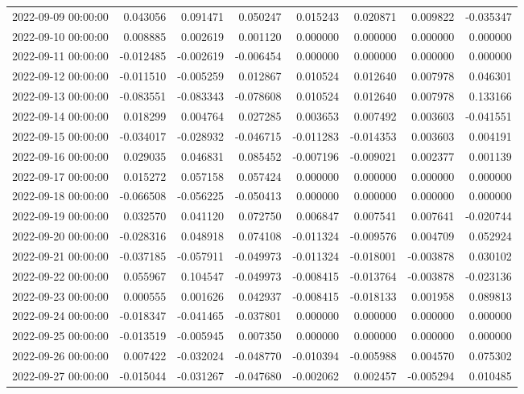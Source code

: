\begin{tabular}{lrrrrrrr}
2022-09-09 00:00:00 & 0.043056 & 0.091471 & 0.050247 & 0.015243 & 0.020871 & 0.009822 & -0.035347 \\
2022-09-10 00:00:00 & 0.008885 & 0.002619 & 0.001120 & 0.000000 & 0.000000 & 0.000000 & 0.000000 \\
2022-09-11 00:00:00 & -0.012485 & -0.002619 & -0.006454 & 0.000000 & 0.000000 & 0.000000 & 0.000000 \\
2022-09-12 00:00:00 & -0.011510 & -0.005259 & 0.012867 & 0.010524 & 0.012640 & 0.007978 & 0.046301 \\
2022-09-13 00:00:00 & -0.083551 & -0.083343 & -0.078608 & 0.010524 & 0.012640 & 0.007978 & 0.133166 \\
2022-09-14 00:00:00 & 0.018299 & 0.004764 & 0.027285 & 0.003653 & 0.007492 & 0.003603 & -0.041551 \\
2022-09-15 00:00:00 & -0.034017 & -0.028932 & -0.046715 & -0.011283 & -0.014353 & 0.003603 & 0.004191 \\
2022-09-16 00:00:00 & 0.029035 & 0.046831 & 0.085452 & -0.007196 & -0.009021 & 0.002377 & 0.001139 \\
2022-09-17 00:00:00 & 0.015272 & 0.057158 & 0.057424 & 0.000000 & 0.000000 & 0.000000 & 0.000000 \\
2022-09-18 00:00:00 & -0.066508 & -0.056225 & -0.050413 & 0.000000 & 0.000000 & 0.000000 & 0.000000 \\
2022-09-19 00:00:00 & 0.032570 & 0.041120 & 0.072750 & 0.006847 & 0.007541 & 0.007641 & -0.020744 \\
2022-09-20 00:00:00 & -0.028316 & 0.048918 & 0.074108 & -0.011324 & -0.009576 & 0.004709 & 0.052924 \\
2022-09-21 00:00:00 & -0.037185 & -0.057911 & -0.049973 & -0.011324 & -0.018001 & -0.003878 & 0.030102 \\
2022-09-22 00:00:00 & 0.055967 & 0.104547 & -0.049973 & -0.008415 & -0.013764 & -0.003878 & -0.023136 \\
2022-09-23 00:00:00 & 0.000555 & 0.001626 & 0.042937 & -0.008415 & -0.018133 & 0.001958 & 0.089813 \\
2022-09-24 00:00:00 & -0.018347 & -0.041465 & -0.037801 & 0.000000 & 0.000000 & 0.000000 & 0.000000 \\
2022-09-25 00:00:00 & -0.013519 & -0.005945 & 0.007350 & 0.000000 & 0.000000 & 0.000000 & 0.000000 \\
2022-09-26 00:00:00 & 0.007422 & -0.032024 & -0.048770 & -0.010394 & -0.005988 & 0.004570 & 0.075302 \\
2022-09-27 00:00:00 & -0.015044 & -0.031267 & -0.047680 & -0.002062 & 0.002457 & -0.005294 & 0.010485 \\

\end{tabular}
